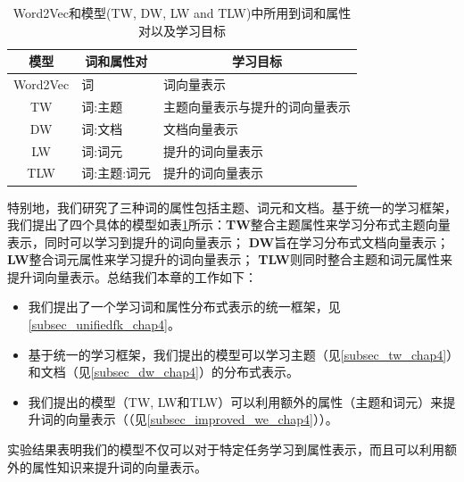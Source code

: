 \documentclass[master]{njuthesis}
\begin{document}
\begin{table}[t]
\begin{center}
\begin{tabular}{|c|l|l|}
\hline
\textbf{模型} & \multicolumn{1}{c|}{\textbf{词和属性对}} & \multicolumn{1}{c|}{\textbf{学习目标}}                        \\ \hline
Word2Vec        & 词                                              & 词向量表示                                                 \\ \hline
TW              & 词:主题                                        & 主题向量表示与提升的词向量表示 \\ \hline
DW              & 词:文档                                     & 文档向量表示                                            \\ \hline
LW              & 词:词元                                      & 提升的词向量表示                           \\ \hline
TLW             & 词:主题:词元                                 & 提升的词向量表示            \\ \hline
\end{tabular}
\end{center}
\caption{\label{tab:word_attributes} Word2Vec\cite{mikolov2013efficient}和模型(TW, DW, LW and TLW)中所用到词和属性对以及学习目标}
\end{table}

特别地，我们研究了三种词的属性包括主题、词元和文档。基于统一的学习框架，我们提出了四个具体的模型如表\ref{tab:word_attributes}所示：\textbf{TW}整合主题属性来学习分布式主题向量表示，同时可以学习到提升的词向量表示； \textbf{DW}旨在学习分布式文档向量表示； \textbf{LW}整合词元属性来学习提升的词向量表示； \textbf{TLW}则同时整合主题和词元属性来提升词向量表示。总结我们本章的工作如下：

\begin{itemize}
\item 我们提出了一个学习词和属性分布式表示的统一框架，见\ref{subsec_unifiedfk_chap4}。
\item 基于统一的学习框架，我们提出的模型可以学习主题（见\ref{subsec_tw_chap4}）和文档（见\ref{subsec_dw_chap4}）的分布式表示。
\item 我们提出的模型（TW, LW和TLW）可以利用额外的属性（主题和词元）来提升词的向量表示（（见\ref{subsec_improved_we_chap4}））。
\end{itemize}

实验结果表明我们的模型不仅可以对于特定任务学习到属性表示，而且可以利用额外的属性知识来提升词的向量表示。
\end{document}
